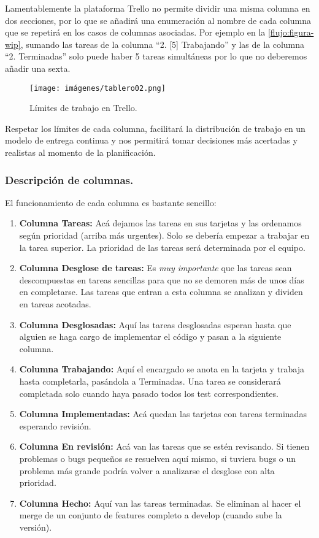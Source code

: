 Lamentablemente la plataforma Trello no permite dividir una misma columna en dos secciones, por lo que se añadirá una enumeración al nombre de cada columna que se repetirá en los casos de columnas asociadas. Por ejemplo en la \autoref{flujo:figura-wip}, sumando las tareas de la columna “2. [5] Trabajando” y las de la columna “2. Terminadas” solo puede haber 5 tareas simultáneas por lo que no deberemos añadir una sexta.

\begin{figure}[h]
	\centering
	\caption{Límites de trabajo en Trello.}
	\label{flujo:figura-wip}
	\texttt{[image: imágenes/tablero02.png]}
\end{figure}

Respetar los límites de cada columna, facilitará la distribución de trabajo en un modelo de entrega continua y nos permitirá tomar decisiones más acertadas y realistas al momento de la planificación.

\subsubsection{Descripción de columnas.}\label{flujo:descripcion-de-columnas}
El funcionamiento de cada columna es bastante sencillo:
\begin{enumerate}
	\item \textbf{Columna Tareas:} Acá dejamos las tareas en sus tarjetas y las ordenamos según prioridad (arriba más urgentes). Solo se debería empezar a trabajar en la tarea superior. La prioridad de las tareas será determinada por el equipo.
	\item \textbf{Columna Desglose de tareas:} Es \textit{muy importante} que las tareas sean descompuestas en tareas sencillas para que no se demoren más de unos días en completarse. Las tareas que entran a esta columna se analizan y dividen en tareas acotadas.
	\item \textbf{Columna Desglosadas:} Aquí las tareas desglosadas esperan hasta que alguien se haga cargo de implementar el código y pasan a la siguiente columna.
	\item \textbf{Columna Trabajando:} Aquí el encargado se anota en la tarjeta y trabaja hasta completarla, pasándola a Terminadas. Una tarea se considerará completada solo cuando haya pasado todos los test correspondientes.
	\item \textbf{Columna Implementadas:} Acá quedan las tarjetas con tareas terminadas esperando revisión.
	\item \textbf{Columna En revisión:} Acá van las tareas que se estén revisando. Si tienen problemas o bugs pequeños se resuelven aquí mismo, si tuviera bugs o un problema más grande podría volver a analizarse el desglose con alta prioridad.
	\item \textbf{Columna Hecho:} Aquí van las tareas terminadas. Se eliminan al hacer el merge de un conjunto de features completo a develop (cuando sube la versión).
\end{enumerate}


